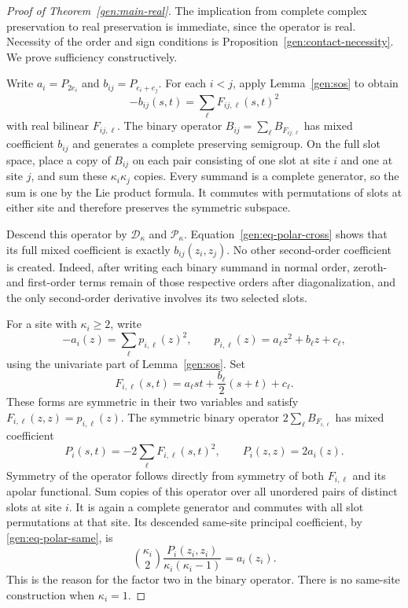 \documentclass[reqno]{amsart}
\theoremstyle{definition}
\theoremstyle{remark}
\begin{document}
\begin{proof}[Proof of Theorem~\ref{gen:main-real}]
The implication from complete complex preservation to real
preservation is immediate, since the operator is real.
Necessity of the order and sign conditions is
Proposition~\ref{gen:contact-necessity}.
We prove sufficiency constructively.

Write \(a_i=P_{2e_i}\) and \(b_{ij}=P_{e_i+e_j}\).
For each \(i<j\), apply Lemma~\ref{gen:sos} to obtain
\[
 -b_{ij}(s,t)=\sum_\ell F_{ij,\ell}(s,t)^2
\]
with real bilinear \(F_{ij,\ell}\).
The binary operator
\(B_{ij}=\sum_\ell B_{F_{ij,\ell}}\) has mixed coefficient
\(b_{ij}\) and generates a complete preserving semigroup.
On the full slot space, place a copy of \(B_{ij}\) on each pair
consisting of one slot at site \(i\) and one at site \(j\), and
sum these \(\kappa_i\kappa_j\) copies.
Every summand is a complete generator, so the sum is one by the
Lie product formula.
It commutes with permutations of slots at either site and therefore
preserves the symmetric subspace.

Descend this operator by \(\mathcal D_\kappa\) and
\(\mathcal P_\kappa\).
Equation~\eqref{gen:eq-polar-cross} shows that its full mixed
coefficient is exactly \(b_{ij}(z_i,z_j)\).
No other second-order coefficient is created.
Indeed, after writing each binary summand in normal order,
zeroth- and first-order terms remain of those respective orders
after diagonalization, and the only second-order derivative
involves its two selected slots.

For a site with \(\kappa_i\geq2\), write
\[
 -a_i(z)=\sum_\ell p_{i,\ell}(z)^2,\qquad
 p_{i,\ell}(z)=a_\ell z^2+b_\ell z+c_\ell,
\]
using the univariate part of Lemma~\ref{gen:sos}.
Set
\[
 F_{i,\ell}(s,t)=a_\ell st+\frac{b_\ell}{2}(s+t)+c_\ell.
\]
These forms are symmetric in their two variables and satisfy
\(F_{i,\ell}(z,z)=p_{i,\ell}(z)\).
The symmetric binary operator
\(2\sum_\ell B_{F_{i,\ell}}\) has mixed coefficient
\[
 P_i(s,t)=-2\sum_\ell F_{i,\ell}(s,t)^2,
 \qquad P_i(z,z)=2a_i(z).
\]
Symmetry of the operator follows directly from symmetry of both
\(F_{i,\ell}\) and its apolar functional.
Sum copies of this operator over all unordered pairs of distinct
slots at site \(i\).
It is again a complete generator and commutes with all slot
permutations at that site.
Its descended same-site principal coefficient, by
\eqref{gen:eq-polar-same}, is
\[
 \binom{\kappa_i}{2}
 \frac{P_i(z_i,z_i)}{\kappa_i(\kappa_i-1)}
 =a_i(z_i).
\]
This is the reason for the factor two in the binary operator.
There is no same-site construction when \(\kappa_i=1\).


\end{proof}
\end{document}
